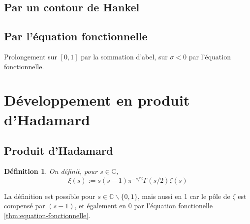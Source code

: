 \documentclass[french]{report}
\newtheorem{definition}[theorem]{Définition}
\begin{document}
\subsection{Par un contour de Hankel}


\subsection{Par l'équation fonctionnelle}

Prolongement sur $[0,1]$ par la sommation d'abel, sur $\sigma<0$ par l'équation fonctionnelle.

\section{Développement en produit d'Hadamard}

\subsection{Produit d'Hadamard}

\begin{definition}
  On définit, pour $s\in\mathbb{C}$,
  \[ \xi(s) := s(s-1)\pi^{-s/2}\Gamma(s/2)\zeta(s) \]
\end{definition}

La définition est possible pour $s\in\mathbb{C}\backslash\{0,1\}$, mais aussi en 1 car le pôle de $\zeta$ est compensé par $(s-1)$, et également en 0 par l'équation fonctionelle \ref{thm:equation-fonctionnelle}.
\\
\end{document}
